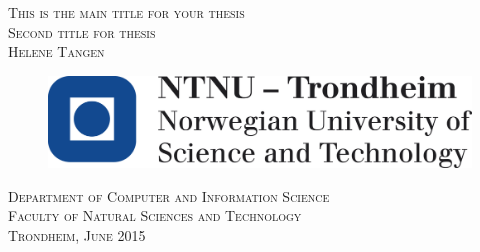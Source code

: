 \begin{titlepage}
 \vspace*{\fill}
    \begin{center}
      {\Huge \scshape \Large This is the main title for your thesis\\ \normalsize Second title for thesis}\\[0.5cm]
      {      \scshape Helene Tangen }
     \end{center}
	\vspace*{3cm}
    \begin{figure}[H]
    \centering
    \includegraphics[scale=0.3]{logo_ntnu_eng}
    \end{figure}
    \begin{center}
    \scshape Department of Computer and Information Science \\
    \scshape Faculty of Natural Sciences and Technology\\
  	\normalfont Trondheim, June 2015
    \end{center}
   \vspace*{\fill}

\end{titlepage}
